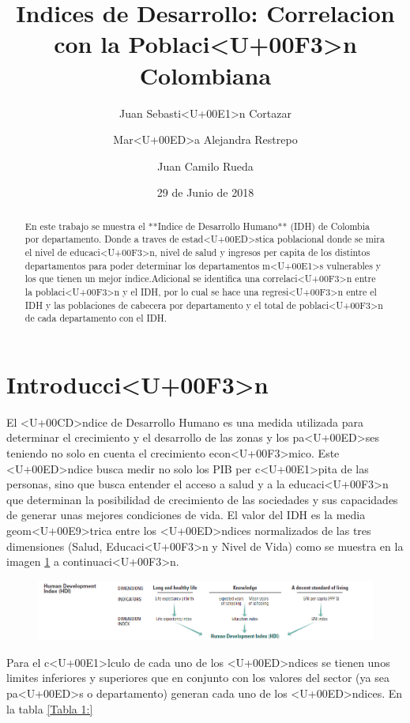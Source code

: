 \documentclass{article}
\title{Indices de Desarrollo: Correlacion con la Poblaci<U+00F3>n Colombiana}
\author[1]{\normalsize Juan Sebasti<U+00E1>n Cortazar}
\author[2]{\normalsize Mar<U+00ED>a Alejandra Restrepo}
\author[3]{\normalsize Juan Camilo Rueda}
\affil[1,2,3]{\small  Universidad de los Andes\\
\texttt{{js.cortazar533,ma.restrepot,jc.rueda169}@uniandes.edu.col}}
\date{29 de Junio de 2018}
\begin{document}


\maketitle


\begin{abstract}
En este trabajo se muestra el **Indice de Desarrollo Humano** (IDH) de Colombia por departamento. Donde a traves de estad<U+00ED>stica poblacional donde se mira el nivel de educaci<U+00F3>n, nivel de salud y ingresos per capita de los distintos departamentos para poder determinar los departamentos m<U+00E1>s vulnerables y los que tienen un mejor indice.Adicional se identifica una correlaci<U+00F3>n entre la poblaci<U+00F3>n y el IDH, por lo cual se hace una regresi<U+00F3>n entre el IDH y las poblaciones de cabecera por departamento y el total de poblaci<U+00F3>n de cada departamento con el IDH. 
\end{abstract}

\section*{Introducci<U+00F3>n}

El <U+00CD>ndice de Desarrollo Humano es una medida utilizada para determinar el crecimiento y el desarrollo de las zonas y los pa<U+00ED>ses teniendo no solo en cuenta el crecimiento econ<U+00F3>mico. Este <U+00ED>ndice busca medir no solo los PIB per c<U+00E1>pita de las personas, sino que busca entender el acceso a salud y a la educaci<U+00F3>n que determinan la posibilidad de crecimiento de las sociedades y sus capacidades de generar unas mejores condiciones de vida. 
El valor del IDH es la media geom<U+00E9>trica entre los <U+00ED>ndices normalizados de las tres dimensiones (Salud, Educaci<U+00F3>n y Nivel de Vida) como se muestra en la imagen \ref{IDH} a continuaci<U+00F3>n. 


\begin{figure}[h]
\centering
\includegraphics{hdiCalc}
\label {IDH}
\end{figure}

Para el c<U+00E1>lculo de cada uno de los <U+00ED>ndices se tienen unos limites inferiores y superiores que en conjunto con los valores del sector (ya sea pa<U+00ED>s o departamento) generan cada uno de los <U+00ED>ndices. En la tabla \ref{Tabla 1:}
\end{document}
